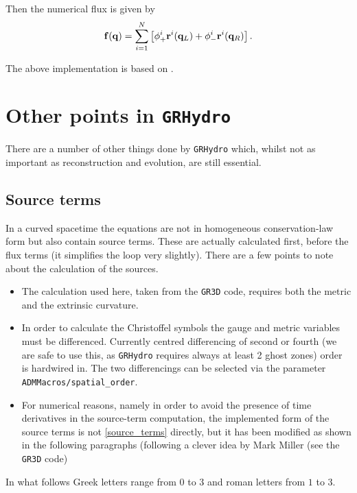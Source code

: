 \documentclass{article}
\begin{document}
Then the numerical flux is given by
\begin{equation}
  \label{marqflux}
  {\bf f}({\bf q}) = \sum_{i=1}^N \left[ {\bf \phi}^i_+ 
  {\bf r}^i ({\bf q}_L) + {\bf \phi}^i_- {\bf r}^i ({\bf q}_R)
  \right].
\end{equation}

The above implementation is based on \cite{Aloy99b}.


\section{Other points in {\tt GRHydro}}
\label{sec:misc}

There are a number of other things done by {\tt GRHydro} which, whilst not as
important as reconstruction and evolution, are still essential.


\subsection{Source terms}
\label{sec:sources}

In a curved spacetime the equations are not in homogeneous conservation-law 
form but also contain source terms. These are actually calculated
first, before the flux terms (it simplifies the loop very slightly).
There are a few points to note about the calculation of the sources.
\begin{itemize}
\item The calculation used here, taken from the {\tt GR3D} code, requires both the
  metric and the extrinsic curvature.
\item In order to calculate the Christoffel symbols the gauge and
  metric variables must be differenced. Currently centred differencing
  of second or fourth (we are safe to use this, as {\tt GRHydro} requires 
  always at least 2 ghost zones) order is hardwired in. The two differencings can be selected via
  the parameter {\tt ADMMacros/spatial\_order}.
\item For numerical reasons, namely in order to avoid the presence of time derivatives
  in the source-term computation, the implemented form of the source terms is not
  \eqref{source_terms} directly, but it has been modified as shown in
  the following paragraphs (following a clever idea by Mark Miller (see the {\tt GR3D} code) 
\end{itemize}

In what follows Greek letters range from $0$ to $3$ and roman letters from $1$ to $3$.
\end{document}

